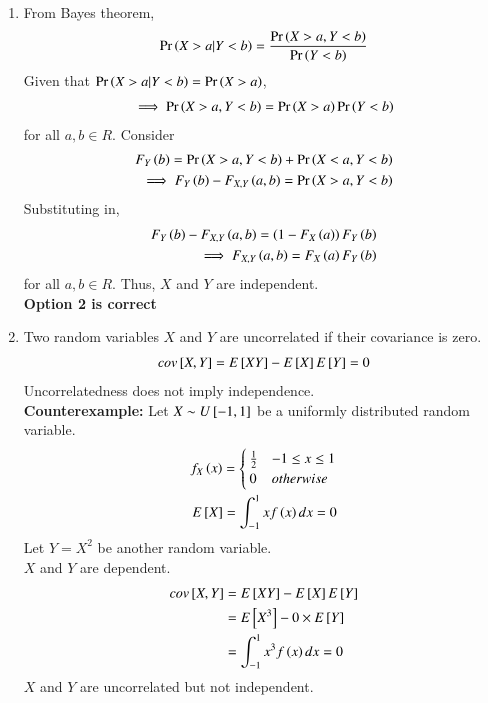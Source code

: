 \documentclass[journal,12pt,twocolumn]{IEEEtran}
\begin{document}
\begin{enumerate}
    \item From Bayes theorem,
    \begin{align}
      \Pr\left(X>a|Y<b\right)=\frac{\Pr\left(X>a,Y<b\right)}{\Pr\left(Y<b\right)}
    \end{align}
    Given that $\Pr\left(X>a|Y<b\right)=\Pr\left(X>a\right)$,
    \begin{align}
        \implies \Pr\left(X>a,Y<b\right)=\Pr\left(X>a\right)\Pr\left(Y<b\right)
    \end{align}
    for all $a,b\in R$. Consider
    \begin{align}
        F_Y\left(b\right)=\Pr\left(X>a,Y<b\right)+\Pr\left(X<a,Y<b\right)\\
        \implies F_Y\left(b\right)-F_{X,Y}\left(a,b\right)=\Pr\left(X>a,Y<b\right)
    \end{align}
    Substituting in,
    \begin{align}
        F_Y\left(b\right)-F_{X,Y}\left(a,b\right)=\left(1-F_X\left(a\right)\right)F_Y\left(b\right)\\
        \implies F_{X,Y}\left(a,b\right)=F_X\left(a\right)F_Y\left(b\right)
    \end{align}
    for all $a,b\in R$. Thus, $X$ and $Y$ are independent. \\
    \textbf{Option 2 is correct}
    \item Two random variables $X$ and $Y$ are uncorrelated if their covariance is zero.
    \begin{align}
        cov{}\left[X,Y\right]=E{}\left[XY\right]-E{}\left[X\right]E{}\left[Y\right]=0
    \end{align}
    Uncorrelatedness does not imply independence.\\
    \textbf{Counterexample:} Let $X\sim U {}\left[-1,1\right]$ be a uniformly distributed random variable.
    \begin{align}
        f_X\left(x\right)=
        \begin{cases}
        \frac{1}{2} & -1\leq x \leq 1\\
        0 & otherwise
        \end{cases}\\
        E{}\left[X\right]=\int_{-1}^{1}x f\left(x\right) dx=0
    \end{align}
    Let $Y=X^2$ be another random variable.\\
    $X$ and $Y$ are dependent.
    \begin{align}
        cov{}\left[X,Y\right]&=E{}\left[XY\right]-E{}\left[X\right]E{}\left[Y\right]\\
        &=E{}\left[X^3\right]-0\times E{}\left[Y\right]\\
        &=\int_{-1}^{1}x^3 f\left(x\right) dx=0
    \end{align}
    $X$ and $Y$ are uncorrelated but not independent.\\

\end{enumerate}
\end{document}
